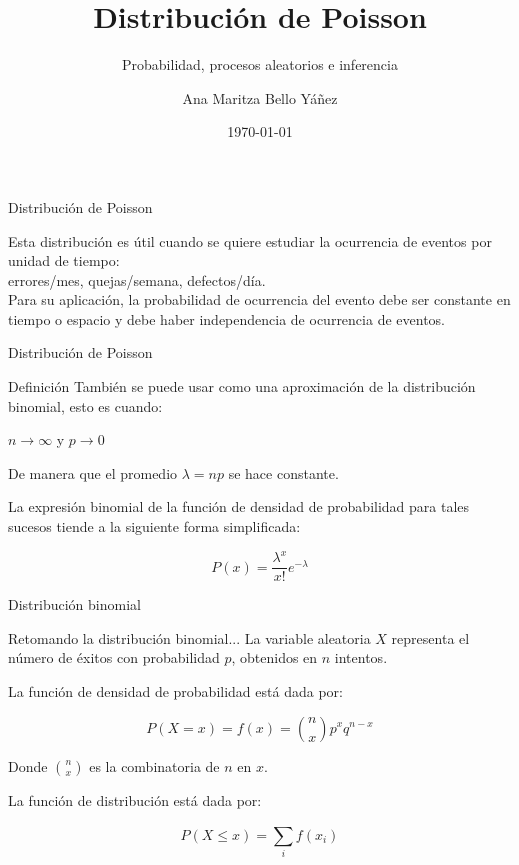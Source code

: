 \documentclass{beamer}
\title[ \hspace{21mm} \insertframenumber \ de \inserttotalframenumber ]
{Distribución de Poisson}
\subtitle
{Probabilidad, procesos aleatorios e inferencia}
\author[]
{Ana Maritza Bello Yáñez}
\institute[Instituto Polit\'ecnico Nacional]
{
  \inst{1}
  Centro de Investigaci\'on en Computaci\'on
  }
\date[Short Occasion]
{\today}
\begin{document}
\begin{frame}
  \titlepage
\end{frame}

\begin{frame}{Distribución de Poisson}
  \begin{block}{}
    Esta distribución es útil cuando se quiere estudiar la ocurrencia de eventos por
    unidad de tiempo:\\
    \vfill
    errores/mes, quejas/semana, defectos/día. \\
    \vfill
    Para su aplicación, la probabilidad de ocurrencia del evento debe ser constante
    en tiempo o espacio y debe haber independencia de ocurrencia de eventos.
  \end{block}
\end{frame}

\begin{frame}{Distribución de Poisson}
  \begin{block}{Definición}
    También se puede usar como una aproximación de la distribución binomial, esto es
    cuando:

    $n \to \infty $ y $p \to 0 $

    De manera que el promedio $\lambda = np$ se hace constante.
  \end{block}

  \begin{block}{}
    La expresión binomial de la función de densidad de probabilidad para tales
    sucesos tiende a la siguiente forma simplificada:

    \begin{equation}
      P(x)=\frac{\lambda ^ x}{x!}e^{-\lambda}
    \end{equation}
  \end{block}
\end{frame}


\begin{frame}{Distribución binomial}
  \begin{block}{Retomando la distribución binomial...}
La variable aleatoria $X$ representa el número de éxitos con probabilidad $p$,
obtenidos en $n$ intentos.

La función de densidad de probabilidad está dada por:

    \begin{equation}
      P(X=x) = f(x) = \binom{n}{x} p^x q^{n-x}
    \end{equation}

    Donde $\binom{n}{x}$ es la combinatoria de $n$ en $x$.

    La función de distribución está dada por:

    \begin{equation}
      P(X \leq x) = \sum_{i}^{} f(x_i)
    \end{equation}

  \end{block}
\end{frame}
\end{document}
